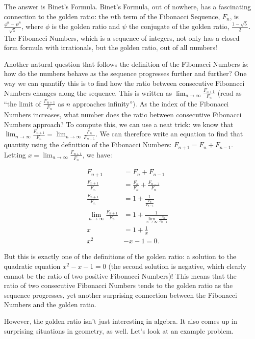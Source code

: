\documentclass{article}
\begin{document}
The answer is Binet’s Formula. Binet’s Formula, out of nowhere, has a fascinating connection to the golden ratio: the $n$th term of the Fibonacci Sequence, $F_n$, is $\frac{\phi^n - \psi^n}{\sqrt5}$, where $\phi$ is the golden ratio and $\psi$ the conjugate of the golden ratio, $\frac{1-\sqrt{5}}{2}$. The Fibonacci Numbers, which is a sequence of integers, not only has a closed-form formula with irrationals, but the golden ratio, out of all numbers!

Another natural question that follows the definition of the Fibonacci Numbers is: how do the numbers behave as the sequence progresses further and further? One way we can quantify this is to find how the ratio between consecutive Fibonacci Numbers changes along the sequence. This is written as $\lim_{n\to\infty}\frac{F_{n+1}}{F_n}$ (read as ``the limit of $\frac{F_{n+1}}{F_n}$ as $n$ approaches infinity''). As the index of the Fibonacci Numbers increases, what number does the ratio between consecutive Fibonacci Numbers approach?
To compute this, we can use a neat trick: we know that $\lim_{n\to\infty}\frac{F_{n+1}}{F_n}=\lim_{n\to\infty}\frac{F_n}{F_{n-1}}$. We can therefore write an equation to find that quantity using the definition of the Fibonacci Numbers: $F_{n+1}=F_n+F_{n-1}$. Letting $x=\lim_{n\to\infty}\frac{F_{n+1}}{F_n}$, we have:

{\footnotesize\begin{align*}
    F_{n+1}&=F_n+F_{n-1}\\
    \frac{F_{n+1}}{F_n}&=\frac{F_n}{F_n}+\frac{F_{n-1}}{F_n}\\
    \frac{F_{n+1}}{F_n}&=1+\frac{1}{\frac{F_n}{F_{n-1}}}\\
    \lim_{n\rightarrow\infty} \frac{F_{n+1}}{F_n}&=1+\frac{1}{\lim_{n\rightarrow\infty} \frac{F_{n}}{F_{n-1}}}\\
    x&=1+\frac{1}{x}\\
    x^2&-x-1=0.
\end{align*}}


But this is exactly one of the definitions of the golden ratio: a solution to the quadratic equation $x^2-x-1=0$ (the second solution is negative, which clearly cannot be the ratio of two positive Fibonacci Numbers)! This means that the ratio of two consecutive Fibonacci Numbers tends to the golden ratio as the sequence progresses, yet another surprising connection between the Fibonacci Numbers and the golden ratio.

However, the golden ratio isn’t just interesting in algebra. It also comes up in surprising situations in geometry, as well. Let’s look at an example problem.
\end{document}
